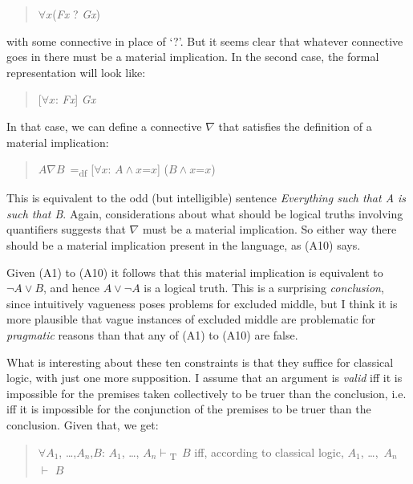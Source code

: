 \begin{quote}
\(\forall x\)(\textit{Fx} ? \textit{Gx})
\end{quote}

\noindent with some connective in place of `?'. But it seems clear that whatever connective goes in there must be a material implication. In the second case, the formal representation will look like:

\begin{quote}
[\(\forall x\): \textit{Fx}] \textit{Gx}
\end{quote}

\noindent In that case, we can define a connective \(\nabla\) that satisfies the definition of a material implication:

\begin{quote}
\(A \nabla B\)~=\textsubscript{df} [\(\forall x\): \(A \wedge x\)=\(x\)] (\(B \wedge x\)=\(x\))
\end{quote}

\noindent This is equivalent to the odd (but intelligible) sentence \textit{Everything such that A is such that B}. Again, considerations about what should be logical truths involving quantifiers suggests that \(\nabla\) must be a material implication. So either way there should be a material implication present in the language, as (A10) says.

Given (A1) to (A10) it follows that this material implication is equivalent to \(\neg A \vee B\), and hence \(A \vee \neg A\) is a logical truth. This is a surprising \textit{conclusion}, since intuitively vagueness poses problems for excluded middle, but I think it is more plausible that vague instances of excluded middle are problematic for \textit{pragmatic} reasons than that any of (A1) to (A10) are false. 

What is interesting about these ten constraints is that they suffice for classical logic, with just one more supposition. I assume that an argument is \textit{valid} iff it is impossible for the premises taken collectively to be truer than the conclusion, i.e. iff it is impossible for the conjunction of the premises to be truer than the conclusion. Given that, we get:

\begin{quote}
\(\forall A_1\), {\dots},\(A_n\),\(B\): \(A_1\), {\dots}, \(A_n \vdash\)\textsubscript{T}~\(B\) iff, according to classical logic, \(A_1\), {\dots},~\(A_n\) \(\vdash\) \(B\)
\end{quote}

